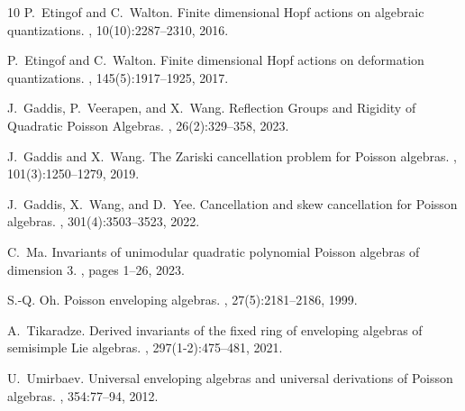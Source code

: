 \documentclass[reqno]{amsart}
\numberwithin{equation}{section}
\theoremstyle{definition}
\begin{document}
\begin{thebibliography}{10}
P.~Etingof and C.~Walton.
\newblock Finite dimensional {H}opf actions on algebraic quantizations.
, 10(10):2287--2310, 2016.

P.~Etingof and C.~Walton.
\newblock Finite dimensional {H}opf actions on deformation quantizations.
, 145(5):1917--1925, 2017.

J.~Gaddis, P.~Veerapen, and X.~Wang.
\newblock Reflection {G}roups and {R}igidity of {Q}uadratic {P}oisson
  {A}lgebras.
, 26(2):329--358, 2023.

J.~Gaddis and X.~Wang.
\newblock The {Z}ariski cancellation problem for {P}oisson algebras.
, 101(3):1250--1279, 2019.

J.~Gaddis, X.~Wang, and D.~Yee.
\newblock Cancellation and skew cancellation for {P}oisson algebras.
, 301(4):3503--3523, 2022.

C.~Ma.
\newblock Invariants of unimodular quadratic polynomial {P}oisson algebras of
  dimension 3.
, pages 1--26, 2023.

S.-Q. Oh.
\newblock Poisson enveloping algebras.
, 27(5):2181--2186, 1999.

A.~Tikaradze.
\newblock Derived invariants of the fixed ring of enveloping algebras of
  semisimple {L}ie algebras.
, 297(1-2):475--481, 2021.

U.~Umirbaev.
\newblock Universal enveloping algebras and universal derivations of {P}oisson
  algebras.
, 354:77--94, 2012.

\end{thebibliography}
\end{document}
